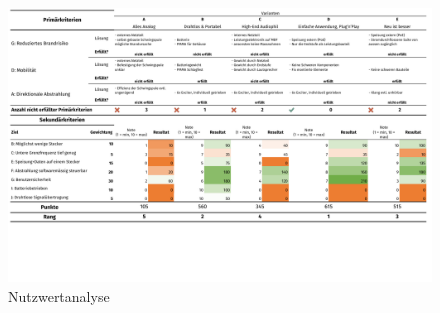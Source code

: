 \newpage
\begin{figure}[H]
	\centering
	\includegraphics[trim={0 3cm 0 0},clip,width=\textheight - 1cm, angle=90]{pictures/Nutzwertanalyse.pdf}
	\caption{Nutzwertanalyse}
	\label{pic:nutzwertanalyse}
\end{figure}
\newpage